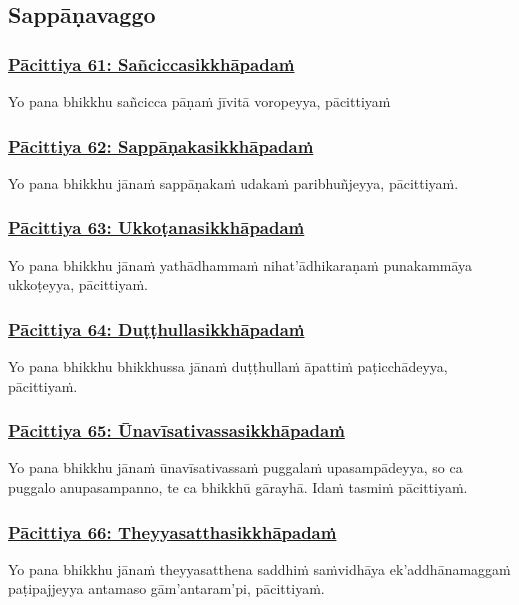 \subsection{Sappāṇavaggo}
\vspace{0.2cm}

\subsubsection*{\hyperref[exp61]{Pācittiya 61: Sañciccasikkhāpadaṁ}}
\label{pac61}
Yo pana bhikkhu sañcicca pāṇaṁ jīvitā voropeyya, pācittiyaṁ

\subsubsection*{\hyperref[exp62]{Pācittiya 62: Sappāṇakasikkhāpadaṁ}}
\label{pac62}
Yo pana bhikkhu jānaṁ sappāṇakaṁ udakaṁ paribhuñjeyya, pācittiyaṁ.

\subsubsection*{\hyperref[exp63]{Pācittiya 63: Ukkoṭanasikkhāpadaṁ}}
\label{pac63}
Yo pana bhikkhu jānaṁ yathādhammaṁ nihat'ādhikaraṇaṁ punakammāya ukkoṭeyya, pācittiyaṁ.

\subsubsection*{\hyperref[exp64]{Pācittiya 64: Duṭṭhullasikkhāpadaṁ}}
\label{pac64}
Yo pana bhikkhu bhikkhussa jānaṁ duṭṭhullaṁ āpattiṁ paṭicchādeyya, pācittiyaṁ.

\subsubsection*{\hyperref[exp65]{Pācittiya 65: Ūnavīsativassasikkhāpadaṁ}}
\label{pac65}
Yo pana bhikkhu jānaṁ ūnavīsativassaṁ puggalaṁ upasampādeyya, so ca puggalo anupasampanno, te ca bhikkhū gārayhā. Idaṁ tasmiṁ pācittiyaṁ.

\subsubsection*{\hyperref[exp66]{Pācittiya 66: Theyyasatthasikkhāpadaṁ}}
\label{pac66}
Yo pana bhikkhu jānaṁ theyyasatthena saddhiṁ saṁvidhāya ek'addhānamaggaṁ paṭipajjeyya antamaso gām'antaram'pi, pācittiyaṁ.

